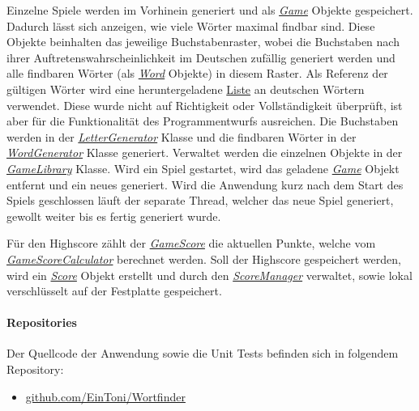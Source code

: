 Einzelne Spiele werden im Vorhinein generiert und als \href{https://github.com/EinToni/Wortfinder/blob/main/Wortfinder/Game.cs}{\textit{Game}} Objekte gespeichert. Dadurch lässt sich anzeigen, wie viele Wörter maximal findbar sind. Diese Objekte beinhalten das jeweilige Buchstabenraster, wobei die Buchstaben nach ihrer Auftretenswahrscheinlichkeit im Deutschen zufällig generiert werden und alle findbaren Wörter (als \href{https://github.com/EinToni/Wortfinder/blob/main/Wortfinder/Word.cs}{\textit{Word}} Objekte) in diesem Raster. Als Referenz der gültigen Wörter wird eine heruntergeladene \href{https://github.com/EinToni/Wortfinder/blob/main/Wortfinder/wordListGerman.txt}{Liste} an deutschen Wörtern verwendet. Diese wurde nicht auf Richtigkeit oder Vollständigkeit überprüft, ist aber für die Funktionalität des Programmentwurfs ausreichen.
Die Buchstaben werden in der \href{https://github.com/EinToni/Wortfinder/blob/main/Wortfinder/LetterGenerator.cs}{\textit{LetterGenerator}} Klasse und die findbaren Wörter in der \href{https://github.com/EinToni/Wortfinder/blob/main/Wortfinder/WordGenerator.cs}{\textit{WordGenerator}} Klasse generiert. Verwaltet werden die einzelnen Objekte in der \href{https://github.com/EinToni/Wortfinder/blob/main/Wortfinder/GameLibrary.cs}{\textit{GameLibrary}} Klasse. 
Wird ein Spiel gestartet, wird das geladene \href{https://github.com/EinToni/Wortfinder/blob/main/Wortfinder/Game.cs}{\textit{Game}} Objekt entfernt und ein neues generiert. Wird die Anwendung kurz nach dem Start des Spiels geschlossen läuft der separate Thread, welcher das neue Spiel generiert, gewollt weiter bis es fertig generiert wurde.


Für den Highscore zählt der \href{https://github.com/EinToni/Wortfinder/blob/main/Wortfinder/GameScore.cs}{\textit{GameScore}} die aktuellen Punkte, welche vom \href{https://github.com/EinToni/Wortfinder/blob/main/Wortfinder/GameScoreCalculator.cs}{\textit{GameScoreCalculator}} berechnet werden. Soll der Highscore gespeichert werden, wird ein \href{https://github.com/EinToni/Wortfinder/blob/main/Wortfinder/Score.cs}{\textit{Score}} Objekt erstellt und durch den \href{https://github.com/EinToni/Wortfinder/blob/main/Wortfinder/ScoreManager.cs}{\textit{ScoreManager}} verwaltet, sowie lokal verschlüsselt auf der Festplatte gespeichert.

\paragraph{Repositories}
Der Quellcode der Anwendung sowie die Unit Tests befinden sich in folgendem Repository:
\begin{itemize}
\item{\href{https://github.com/EinToni/Wortfinder}{github.com/EinToni/Wortfinder}}
\end{itemize}

